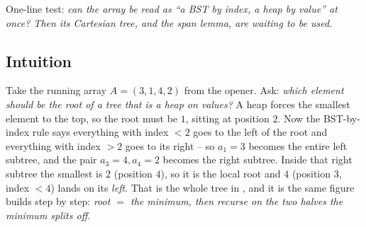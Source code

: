 \begin{recognitionbox}
One-line test: \emph{can the array be read as ``a BST by index, a heap by value'' at once? Then its
Cartesian tree, and the span lemma, are waiting to be used.}
\end{recognitionbox}

\subsection{Intuition}

Take the running array $A = (3,1,4,2)$ from the opener. Ask: \emph{which element should be the root of
a tree that is a heap on values?} A heap forces the smallest element to the top, so the root must be
$1$, sitting at position $2$. Now the BST-by-index rule says everything with index $<2$ goes to the
left of the root and everything with index $>2$ goes to its right -- so $a_1=3$ becomes the entire left
subtree, and the pair $a_3=4,a_4=2$ becomes the right subtree. Inside that right subtree the smallest is
$2$ (position $4$), so it is the local root and $4$ (position $3$, index $<4$) lands on its \emph{left}.
That is the whole tree in , and it is the same figure  builds step
by step: \emph{root $=$ the minimum, then recurse on the two halves the minimum splits off}.


